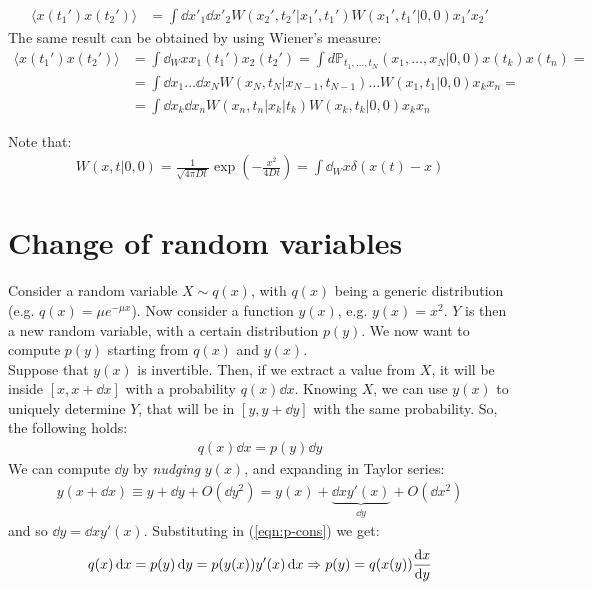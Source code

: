 \documentclass[../template.tex]{subfiles}
\begin{document}
\begin{example}
    \begin{align*}
        \langle x(t_1')x(t_2') \rangle &= \int \dd{x'_1} \dd{x'_2} W(x_2', t_2'|x_1',t_1')W(x_1',t_1'|0,0)x_1' x_2'
    \end{align*}
    The same result can be obtained by using Wiener's measure:
    \begin{align*}
        \langle x(t_1') x(t_2') \rangle&= \int \dd{_Wx} x_1(t_1')x_2(t_2') = \int d\mathbb{P}_{t_1,\dots, t_N} (x_1, \dots, x_N|0,0) x(t_k)x(t_n) =\\
        &= \int \dd{x_1}\dots \dd{x_N} W(x_N,t_N|x_{N-1},t_{N-1}) \dots W(x_1, t_1|0,0) x_k x_n =\\
        &= \int \dd{x_k} \dd{x_n} W(x_n,t_n|x_k|t_k) W(x_k,t_k|0,0) x_k x_n
    \end{align*}
\end{example}
Note that:
\begin{align*}
    W(x,t|0,0) = \frac{1}{\sqrt{4\pi D t}} \exp\left(-\frac{x^2}{4 D t} \right) = \int \dd{_W x} \delta(x(t)-x)
\end{align*}

\section{Change of random variables}
Consider a random variable $X \sim q(x)$, with $q(x)$ being a generic distribution (e.g. $q(x) = \mu e^{-\mu x}$). Now consider a function $y(x)$, e.g. $y(x) = x^2$. $Y$ is then a new random variable, with a certain distribution $p(y)$. We now want to compute $p(y)$ starting from $q(x)$ and $y(x)$.\\
Suppose that $y(x)$ is invertible. Then, if we extract a value from $X$, it will be inside $[x,x+\dd{x}]$ with a probability $q(x) \dd{x}$. Knowing $X$, we can use $y(x)$ to uniquely determine $Y$, that will be in $[y,y+\dd{y}]$ with the same probability. So, the following holds:
\begin{align}
    q(x) \dd{x} = p(y) \dd{y}
    \label{eqn:p-cons}
\end{align}        
We can compute $\dd{y}$ by \textit{nudging} $y(x)$, and expanding in Taylor series:  
\begin{align*}
    y(x+\dd{x}) \equiv y + \dd{y} + O(\dd{y}^2) = y(x) + \underbrace{\dd{x} y'(x)}_{\dd{y}} + O(\dd{x}^2) 
\end{align*} 
and so $\dd{y} = \dd{x} y'(x)$. Substituting in (\ref{eqn:p-cons}) we get:
\begin{align*}
    q(x) \dd{x} = p(y)\dd{y} = p(y(x)) y'(x) \dd{x} \Rightarrow p(y) = q(x(y)) \dv{x}{y} (x(y))
\end{align*}  
\end{document}
